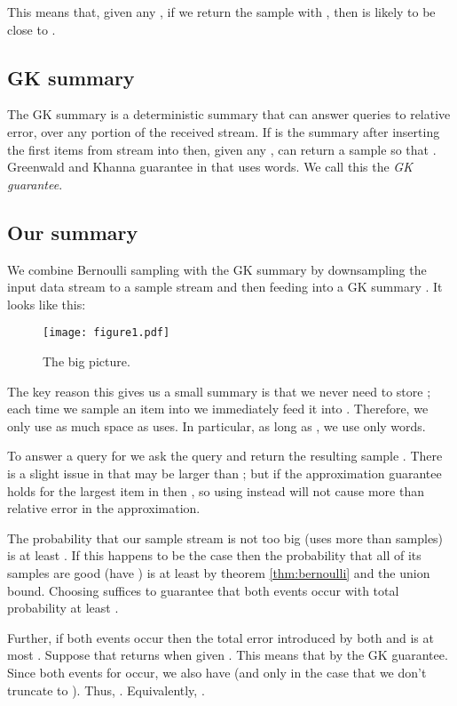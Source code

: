 \documentclass{article}
\theoremstyle{plain}
\begin{document}
This means that, given any , if we return the sample  with , then  is likely to be
close to .



\subsection{GK summary}

The GK summary is a deterministic summary that can answer queries to relative
error, over any portion of the received stream. If  is the summary after
inserting the first  items  from stream  into  then, given any ,  can return a sample  so that
. Greenwald and Khanna guarantee in
\cite{GK2001} that  uses  words. We call
this the \emph{GK guarantee}.



\subsection{Our summary}

We combine Bernoulli sampling with the GK summary by downsampling the input data
stream  to a sample stream  and then feeding  into a GK summary . It
looks like this:

\begin{figure}[H]
  \texttt{[image: figure1.pdf]}
  \centering
  \caption{The big picture.}
  \label{fig:figure1}
\end{figure}

The key reason this gives us a small summary is that we never need to store ;
each time we sample an item into  we immediately feed it into . Therefore,
we only use as much space as  uses. In particular, as long as , we use only  words.

To answer a query  for  we ask  the query  and
return the resulting sample . There is a slight issue in that 
may be larger than ; but if the approximation guarantee holds for the
largest item in  then , so using
 instead will not cause more than  relative
error in the approximation.

The probability that our sample stream  is not too big (uses more than  samples) is at least . If this happens to be the case
then the probability that all of its samples  are good (have
) is at least  by theorem \ref{thm:bernoulli} and the union bound.
Choosing  suffices to guarantee that both
events occur with total probability at least .

Further, if both  events occur then the total error introduced by both
 and  is at most . Suppose that  returns  when
given . This means that  by the GK guarantee. Since both events for
 occur, we also have  (and only  in the case that we don't truncate
 to ). Thus, . Equivalently, .
\end{document}
